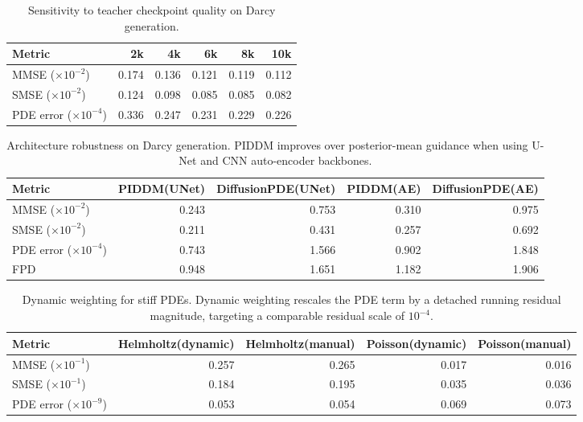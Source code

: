 \documentclass{article}
\theoremstyle{plain}
\theoremstyle{definition}
\theoremstyle{remark}
\begin{document}
\begin{table}[!htbp]
\centering
\setlength{\tabcolsep}{4pt}
\renewcommand{\arraystretch}{1.15}
\caption{Sensitivity to teacher checkpoint quality on Darcy generation.}
\label{tab:appendix_teacher_quality}
\begin{tabular}{lrrrrr}
\toprule
Metric & 2k & 4k & 6k & 8k & 10k \\
\midrule
MMSE ($\times 10^{-2}$) & 0.174 & 0.136 & 0.121 & 0.119 & 0.112 \\
SMSE ($\times 10^{-2}$) & 0.124 & 0.098 & 0.085 & 0.085 & 0.082 \\
PDE error ($\times 10^{-4}$) & 0.336 & 0.247 & 0.231 & 0.229 & 0.226 \\
\bottomrule
\end{tabular}
\end{table}

\begin{table}[!htbp]
\centering
\setlength{\tabcolsep}{3pt}
\renewcommand{\arraystretch}{1.15}
\caption{Architecture robustness on Darcy generation. PIDDM improves over posterior-mean guidance when using U-Net and CNN auto-encoder backbones.}
\label{tab:appendix_architecture}
\begin{tabular}{lrrrr}
\toprule
Metric & PIDDM(UNet) & DiffusionPDE(UNet) & PIDDM(AE) & DiffusionPDE(AE) \\
\midrule
MMSE ($\times 10^{-2}$) & 0.243 & 0.753 & 0.310 & 0.975 \\
SMSE ($\times 10^{-2}$) & 0.211 & 0.431 & 0.257 & 0.692 \\
PDE error ($\times 10^{-4}$) & 0.743 & 1.566 & 0.902 & 1.848 \\
FPD & 0.948 & 1.651 & 1.182 & 1.906 \\
\bottomrule
\end{tabular}
\end{table}

\begin{table}[!htbp]
\centering
\setlength{\tabcolsep}{3pt}
\renewcommand{\arraystretch}{1.15}
\caption{Dynamic weighting for stiff PDEs. Dynamic weighting rescales the PDE term by a detached running residual magnitude, targeting a comparable residual scale of $10^{-4}$.}
\label{tab:appendix_dynamic_weighting}
\begin{tabular}{lrrrr}
\toprule
Metric & Helmholtz(dynamic) & Helmholtz(manual) & Poisson(dynamic) & Poisson(manual) \\
\midrule
MMSE ($\times 10^{-1}$) & 0.257 & 0.265 & 0.017 & 0.016 \\
SMSE ($\times 10^{-1}$) & 0.184 & 0.195 & 0.035 & 0.036 \\
PDE error ($\times 10^{-9}$) & 0.053 & 0.054 & 0.069 & 0.073 \\
\bottomrule
\end{tabular}
\end{table}
\end{document}
